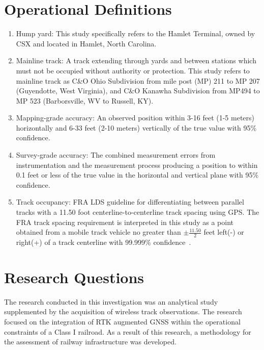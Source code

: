 \section{Operational Definitions}

\begin{enumerate}
\firmlist

	\item Hump yard: This study specifically refers to the Hamlet Terminal, owned by CSX and located in Hamlet, North Carolina.

	\item Mainline track: A track extending through yards and between stations which must not be occupied without authority or protection. This study refers to mainline track as C\&O Ohio Subdivision from mile post (MP) 211 to MP 207 (Guyendotte, West Virginia), and C\&O Kanawha Subdivision from MP494 to MP 523 (Barborsville, WV to Russell, KY).

	\item Mapping-grade accuracy: An observed position within 3-16 feet (1-5 meters)  horizontally and 6-33 feet (2-10 meters) vertically of the true value with 95\% confidence.

	\item Survey-grade accuracy: The combined measurement errors from instrumentation and the measurement process producing a position to within 0.1 feet or less of the true value in the horizontal and vertical plane with 95\% confidence.

	\item Track occupancy: FRA LDS guideline for differentiating between parallel tracks with a 11.50 foot centerline-to-centerline track spacing using GPS. The FRA track spacing requirement is interpreted in this study as a point obtained from a mobile track vehicle no greater than $\pm\frac{11.50}{2}$ feet left(-) or right(+) of a track centerline with 99.999\% confidence~\cite[pp.6-7]{1995FRADiffe}.

\end{enumerate}

\section{Research Questions}
The research conducted in this investigation was an analytical study
supplemented by the acquisition of wireless track observations. The research focused on the integration of RTK augmented GNSS within the operational constraints of a Class I railroad. As a result of this research, a methodology for the assessment of railway infrastructure was developed.

